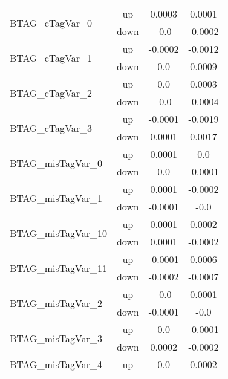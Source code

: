 \begin{table}[h!]
\begin{tabular}{lccc}
\multirow{2}{*}{BTAG\_cTagVar\_0}      & up   &     0.0003      &     0.0001      \\
                                       & down &     -0.0        &     -0.0002       \\ \hline
\multirow{2}{*}{BTAG\_cTagVar\_1}      & up   &     -0.0002     &     -0.0012      \\
                                       & down &     0.0         &     0.0009       \\ \hline
\multirow{2}{*}{BTAG\_cTagVar\_2}      & up   &     0.0         &     0.0003      \\
                                       & down &     -0.0        &     -0.0004       \\ \hline
\multirow{2}{*}{BTAG\_cTagVar\_3}      & up   &     -0.0001     &     -0.0019      \\
                                       & down &     0.0001      &     0.0017       \\ \hline
\multirow{2}{*}{BTAG\_misTagVar\_0}      & up   &     0.0001    &     0.0      \\
                                       & down &     0.0     &     -0.0001       \\ \hline
\multirow{2}{*}{BTAG\_misTagVar\_1}      & up   &     0.0001    &     -0.0002      \\
                                       & down &     -0.0001     &     -0.0       \\ \hline
\multirow{2}{*}{BTAG\_misTagVar\_10}      & up   &     0.0001   &     0.0002      \\
                                       & down &     0.0001      &     -0.0002       \\ \hline
\multirow{2}{*}{BTAG\_misTagVar\_11}      & up   &     -0.0001  &     0.0006      \\
                                       & down &     -0.0002     &     -0.0007       \\ \hline
\multirow{2}{*}{BTAG\_misTagVar\_2}      & up   &     -0.0      &     0.0001      \\
                                       & down &     -0.0001     &     -0.0       \\ \hline
\multirow{2}{*}{BTAG\_misTagVar\_3}      & up   &     0.0       &     -0.0001      \\
                                       & down &     0.0002      &     -0.0002       \\ \hline
\multirow{2}{*}{BTAG\_misTagVar\_4}      & up   &     0.0       &     0.0002      \\

\end{tabular}
\end{table}
